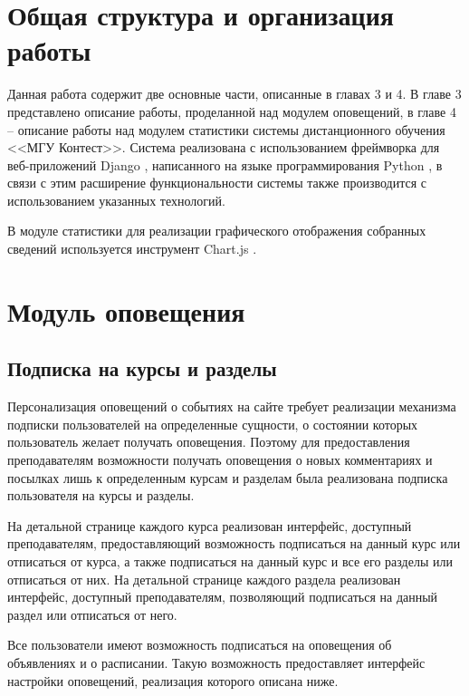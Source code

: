 \documentclass[12pt, a4paper, oneside]{article}
\begin{document}
\section{Общая структура и организация работы}
Данная работа содержит две основные части, описанные в главах 3 и 4. В главе 3 представлено описание работы, проделанной над модулем оповещений, в главе 4 – описание работы над модулем статистики системы дистанционного обучения <<МГУ Контест>>. Система реализована с использованием фреймворка для веб-приложений Django \cite{django}, написанного на языке программирования Python \cite{python}, в связи с этим расширение функциональности системы также производится с использованием указанных технологий.

В модуле статистики для реализации графического отображения собранных сведений используется инструмент Chart.js \cite{chartjs}.
\newpage

\section{Модуль оповещения}
\subsection{Подписка на курсы и разделы}
Персонализация оповещений о событиях на сайте требует реализации механизма подписки пользователей на определенные сущности, о состоянии которых пользователь желает получать оповещения. Поэтому для предоставления преподавателям возможности получать оповещения о новых комментариях и посылках лишь к определенным курсам и разделам была реализована подписка пользователя на курсы и разделы.

На детальной странице каждого курса реализован интерфейс, доступный преподавателям, предоставляющий возможность подписаться на данный курс или отписаться от курса, а также подписаться на данный курс и все его разделы или отписаться от них. На детальной странице каждого раздела реализован интерфейс, доступный преподавателям, позволяющий подписаться на данный раздел или отписаться от него.

Все пользователи имеют возможность подписаться на оповещения об объявлениях и о расписании. Такую возможность предоставляет интерфейс настройки оповещений, реализация которого описана ниже.
\end{document}
